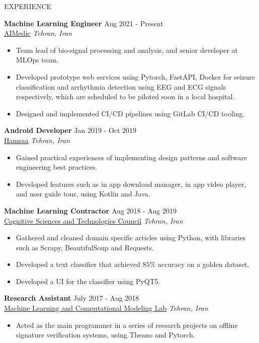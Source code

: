 \documentclass{resume} %
\begin{document}
	 \begin{rSection}{EXPERIENCE}
		
		\textbf{Machine Learning Engineer} \hfill Aug 2021 - Present\\
		\href{https://aimedic.co/}{AIMedic} \hfill \textit{Tehran, Iran}
		\begin{itemize}
			\item Team lead of bio-signal processing and analysis, and senior developer at MLOps team. 
			\item Developed prototype web services using Pytorch, FastAPI, Docker for seizure classification and arrhythmia detection using EEG and ECG signals respectively, which are scheduled to be piloted soon in a local hospital.
			\item Designed and implemented CI/CD pipelines using GitLab CI/CD tooling.

		\end{itemize}

		\textbf{Android Developer} \hfill Jan 2019 - Oct 2019\\
		\href{https://hamsaa.ir/}{Hamsaa} \hfill \textit{Tehran, Iran}
		\begin{itemize}
			\item Gained practical experiences of implementing design patterns and software engineering best practices.
			\item Developed features such as in app download manager, in app video player, and user guide tour, using Kotlin and Java.
		\end{itemize}
		
		\textbf{Machine Learning Contractor} \hfill Aug 2018 - Aug 2019\\
		\href{https://cogc.ir/?lang=2}{Cognitive Sciences and Technologies Council}
		\hfill \textit{Tehran, Iran}
		\begin{itemize}
			\item Gathered and cleaned domain specific articles using Python, with libraries such as Scrapy, BeautifulSoup and Requests.
			\item Developed a text classifier that achieved $85\%$ accuracy on a golden dataset.
			\item Developed a UI for the classifier using PyQT5.
		\end{itemize}
		
		\textbf{Research Assistant} \hfill July 2017 - Aug 2018\\
		\href{http://mlcm.ut.ac.ir/}{Machine Learning and Computational Modeling Lab} \hfill \textit{Tehran, Iran}
		\begin{itemize}
			\item Acted as the main programmer in a series of research projects on offline signature verification systems, using Theano and Pytorch.
		\end{itemize}
		
	\end{rSection} 
	
\end{document}
